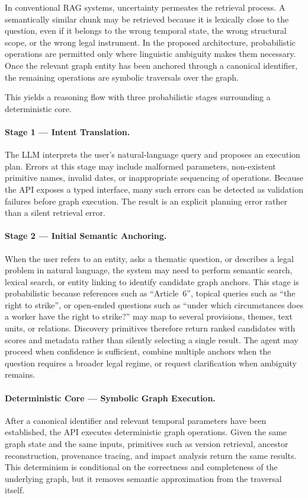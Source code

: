 \documentclass[11pt]{article}
\begin{document}
In conventional RAG systems, uncertainty permeates the retrieval process. A semantically similar chunk may be retrieved because it is lexically close to the question, even if it belongs to the wrong temporal state, the wrong structural scope, or the wrong legal instrument. In the proposed architecture, probabilistic operations are permitted only where linguistic ambiguity makes them necessary. Once the relevant graph entity has been anchored through a canonical identifier, the remaining operations are symbolic traversals over the graph.

This yields a reasoning flow with three probabilistic stages surrounding a deterministic core.

\paragraph{Stage 1 --- Intent Translation.}
The LLM interprets the user's natural-language query and proposes an execution plan. Errors at this stage may include malformed parameters, non-existent primitive names, invalid dates, or inappropriate sequencing of operations. Because the API exposes a typed interface, many such errors can be detected as validation failures before graph execution. The result is an explicit planning error rather than a silent retrieval error.

\paragraph{Stage 2 --- Initial Semantic Anchoring.}
When the user refers to an entity, asks a thematic question, or describes a legal problem in natural language, the system may need to perform semantic search, lexical search, or entity linking to identify candidate graph anchors. This stage is probabilistic because references such as ``Article~6'', topical queries such as ``the right to strike'', or open-ended questions such as ``under which circumstances does a worker have the right to strike?'' may map to several provisions, themes, text units, or relations. Discovery primitives therefore return ranked candidates with scores and metadata rather than silently selecting a single result. The agent may proceed when confidence is sufficient, combine multiple anchors when the question requires a broader legal regime, or request clarification when ambiguity remains.

\paragraph{Deterministic Core --- Symbolic Graph Execution.}
After a canonical identifier and relevant temporal parameters have been established, the API executes deterministic graph operations. Given the same graph state and the same inputs, primitives such as version retrieval, ancestor reconstruction, provenance tracing, and impact analysis return the same results. This determinism is conditional on the correctness and completeness of the underlying graph, but it removes semantic approximation from the traversal itself.
\end{document}
